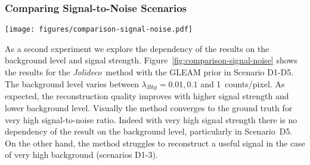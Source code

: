 \documentclass[twocolumn]{aastex631}
\newcommand{\jolideco}{\textit{Jolideco}~}
\begin{document}
    \subsubsection{Comparing Signal-to-Noise Scenarios}
    \begin{figure*}
        \begin{centering}
            \texttt{[image: figures/comparison-signal-noise.pdf]}
            \caption{
                Comparison of \jolideco with the GLEAM v0.1 prior for different background levels and signal strength, as represented by scenario D1-D5. The images are grouped by background level with each pair of columns showing the counts data in the left column and the reconstruction in the right column. The rows show the scenarios D1-D5 as described in Section~\ref{subsec:test-datasets}. The background levels correspond to \qty[mode = text]{0.001}{cts / pixel}, \qty[mode = text]{0.01}{cts / pixel} and \qty[mode = text]{0.1}{cts / pixel}. The complete results for the simulations and additional information are available at \url{https://jolideco.github.io/jolideco-comparison}.
            }
            \label{fig:comparison-signal-noise}
        \end{centering}
    \end{figure*}
    As a second experiment we explore the dependency of the results on the background level and signal strength. Figure~\ref{fig:comparison-signal-noise} shows the results for the \jolideco method with the GLEAM prior in Scenario D1-D5. The background level varies between $\lambda_{Bkg}= 0.01, 0.1$ and \qty[mode = text]{1}{counts/pixel}. As expected, the reconstruction quality improves with higher signal strength and lower background level. Visually the method converges to the ground truth for very high signal-to-noise ratio. Indeed with very high signal strength there is no dependency of the result on the background level, particularly in %
    Scenario~D5. On the other hand, the method struggles to reconstruct a useful signal in the case of very high background (scenarios D1-3). 
\end{document}
